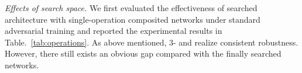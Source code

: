 \documentclass[sigconf]{acmart}
\begin{document}
\textit{Effects of search space.} We first evaluated the effectiveness of searched architecture with single-operation composited networks under standard adversarial training and reported the experimental results in  Table.~\ref{tab:operations}. As above mentioned, 3- and  realize consistent robustness. However, there still exists an obvious gap compared with the finally searched networks. 

\begin{table}[]
	\centering
	
	\caption{Effectiveness of operations on MFNet benchmark.}~\label{tab:operations}
	
	\renewcommand{\arraystretch}{1.1}
	\end{table}
\end{document}
